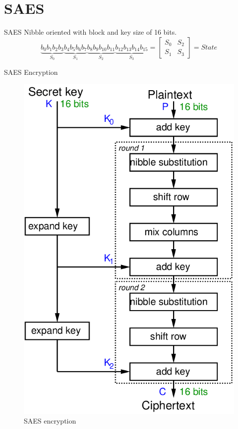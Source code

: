 \section{SAES}

\begin{frame}{SAES}
Nibble oriented with block and key size of 16 bits.
\[
    \underbrace{b_0b_1b_2b_3}_\text{$S_0$}  
    \underbrace{b_4b_5b_6b_7}_\text{$S_1$}
    \underbrace{b_8b_9b_{10}b_{11}}_\text{$S_2$}
    \underbrace{b_{12}b_{13}b_{14}b_{15 }}_\text{$S_3$} = 
    \begin{bmatrix}
    S_0 & S_2\\
    S_1 & S_3
    \end{bmatrix} 
    = State
\]
\end{frame}
\begin{frame}{SAES Encryption}
    \begin{figure}[h!]
    \centering
    \includegraphics[width=0.4\linewidth]{saes/saes-encryption.png}
    \caption{SAES encryption }
    \label{fig:saes-encryption}
\end{figure}
\end{frame}
